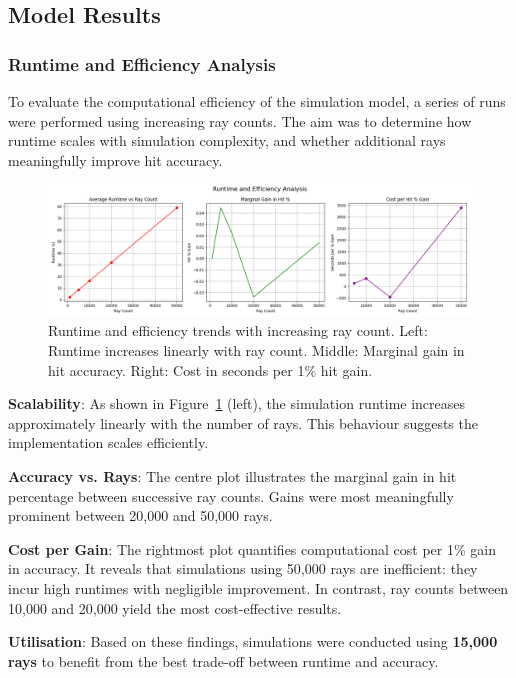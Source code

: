\subsection{Model Results}

\subsubsection{Runtime and Efficiency Analysis}

To evaluate the computational efficiency of the simulation model, a series of runs were performed using increasing ray counts. The aim was to determine how runtime scales with simulation complexity, and whether additional rays meaningfully improve hit accuracy.

\begin{figure}[H]
    \centering
    \includegraphics[width=\textwidth]{chapters/methodology/SoftwareModel/images/run time analysis.png}
    \caption{Runtime and efficiency trends with increasing ray count. Left: Runtime increases linearly with ray count. Middle: Marginal gain in hit accuracy. Right: Cost in seconds per 1\% hit gain.}
    \label{fig:runtime_efficiency}
\end{figure}

\textbf{Scalability}: As shown in Figure~\ref{fig:runtime_efficiency} (left), the simulation runtime increases approximately linearly with the number of rays. This behaviour suggests the implementation scales efficiently.

\textbf{Accuracy vs. Rays}: The centre plot illustrates the marginal gain in hit percentage between successive ray counts. Gains were most meaningfully prominent between 20,000 and 50,000 rays.

\textbf{Cost per Gain}: The rightmost plot quantifies computational cost per 1\% gain in accuracy. It reveals that simulations using 50,000 rays are inefficient: they incur high runtimes with negligible improvement. In contrast, ray counts between 10,000 and 20,000 yield the most cost-effective results.

\textbf{Utilisation}: Based on these findings, simulations were conducted using \textbf{15,000 rays} to benefit from the best trade-off between runtime and accuracy.

